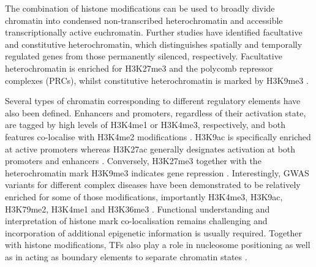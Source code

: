 The combination of histone modifications can be used to broadly divide chromatin into condensed non-transcribed heterochromatin and accessible transcriptionally active euchromatin. Further studies have identified facultative and constitutive heterochromatin, which distinguishes spatially and temporally regulated genes from those permanently silenced, respectively. Facultative heterochromatin is enriched for H3K27me3 and the polycomb repressor complexes (PRCs), whilst constitutive heterochromatin is marked by H3K9me3 \parencite{Hansen2008,Bannister2001}.

Several types of chromatin corresponding to different regulatory elements have also been defined. Enhancers and promoters, regardless of their activation state, are tagged by high levels of H3K4me1 or H3K4me3, respectively, and both features co-localise with H3K4me2 modifications \parencite{Heintzman2007,Hon2009}. H3K9ac is specifically enriched at active promoters whereas H3K27ac generally designates activation at both promoters and enhancers \parencite{Hon2009,Creyghton2010}. Conversely, H3K27me3 together with the heterochromatin mark H3K9me3 indicates gene repression \parencite{Hansen2008,Bannister2001,Pan2007}. Interestingly, GWAS variants for different complex diseases have been demonstrated to be relatively enriched for some of those modifications, importantly H3K4me3, H3K9ac, H3K79me2, H3K4me1 and H3K36me3 \parencite{Ernst2011, Trynka2013}. Functional understanding and interpretation of histone mark co-localisation remains challenging and incorporation of additional epigenetic information is usually required. 
Together with histone modifications, TFs also play a role in nucleosome positioning as well as in acting as boundary elements to separate chromatin states \parencite{Vierstra2014,Zhang2009,Bell2000}. %

